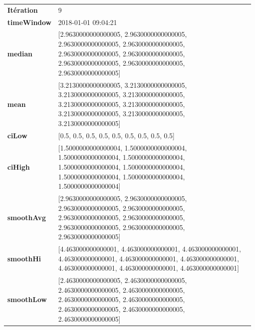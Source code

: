 \begin{table}[H]
	\centering
	\begin{tabularx}{\textwidth}{lX}
		\textbf{Itération}& 9 \\
		\textbf{timeWindow}	 &   2018-01-01 09:04:21  \\
		\textbf{median} &[2.9630000000000005, 2.9630000000000005, 2.9630000000000005, 2.9630000000000005, 2.9630000000000005, 2.9630000000000005, 2.9630000000000005, 2.9630000000000005, 2.9630000000000005] 
		\\ 
		\textbf{mean} & [3.2130000000000005, 3.2130000000000005, 3.2130000000000005, 3.2130000000000005, 3.2130000000000005, 3.2130000000000005, 3.2130000000000005, 3.2130000000000005, 3.2130000000000005] 
		\\
		\textbf{ciLow} & [0.5, 0.5, 0.5, 0.5, 0.5, 0.5, 0.5, 0.5, 0.5] \\
		\textbf{ciHigh}&[1.5000000000000004, 1.5000000000000004, 1.5000000000000004, 1.5000000000000004, 1.5000000000000004, 1.5000000000000004, 1.5000000000000004, 1.5000000000000004, 1.5000000000000004] 
		\\
		\textbf{smoothAvg} & [2.9630000000000005, 2.9630000000000005, 2.9630000000000005, 2.9630000000000005, 2.9630000000000005, 2.9630000000000005, 2.9630000000000005, 2.9630000000000005, 2.9630000000000005] 
		\\
		\textbf{smoothHi} & [4.463000000000001, 4.463000000000001, 4.463000000000001, 4.463000000000001, 4.463000000000001, 4.463000000000001, 4.463000000000001, 4.463000000000001, 4.463000000000001] 
		\\
		\textbf{smoothLow} & [2.4630000000000005, 2.4630000000000005, 2.4630000000000005, 2.4630000000000005, 2.4630000000000005, 2.4630000000000005, 2.4630000000000005, 2.4630000000000005, 2.4630000000000005]
		\\ 
	\end{tabularx} 
\end{table}

